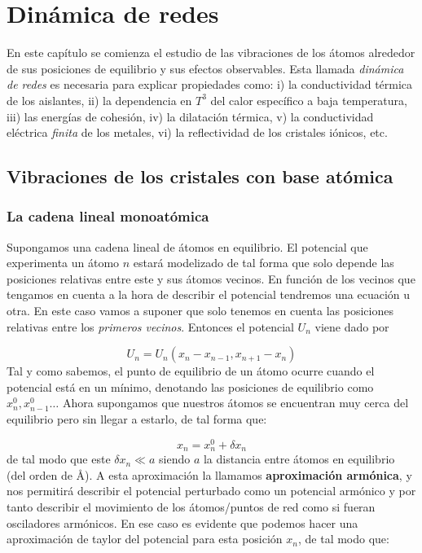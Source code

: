 
\chapter{Dinámica de redes} \label{Ch:04}

En este capítulo se comienza el estudio de las vibraciones de los átomos alrededor de sus posiciones de equilibrio y sus efectos observables. Esta llamada \textit{dinámica de redes} es necesaria para explicar propiedades como: i) la conductividad térmica de los aislantes, ii) la dependencia en $T^3$ del calor específico a baja temperatura, iii) las energías de cohesión, iv) la dilatación térmica, v) la conductividad eléctrica \textit{finita} de los metales, vi) la reflectividad de los cristales iónicos, etc.

\section{Vibraciones de los cristales con base atómica}

\subsection{La cadena lineal monoatómica}

Supongamos una cadena lineal de átomos en equilibrio. El potencial que experimenta un átomo $n$ estará modelizado de tal forma que solo depende las posiciones relativas entre este y sus átomos vecinos. En función de los vecinos que tengamos en cuenta a la hora de describir el potencial tendremos una ecuación u otra. En este caso vamos a suponer que solo tenemos en cuenta las posiciones relativas entre los \textit{primeros vecinos}. Entonces el potencial $U_n$ viene dado por

\begin{equation}
	U_n = U_n (x_n-x_{n-1},x_{n+1}-x_n)
\end{equation}
Tal y como sabemos, el punto de equilibrio de un átomo ocurre cuando el potencial está en un mínimo, denotando las posiciones de equilibrio como $x_n^0,x_{n-1}^0\ldots$ Ahora supongamos que nuestros átomos se encuentran muy cerca del equilibrio pero sin llegar a estarlo, de tal forma que:

\begin{equation}
	x_n = x_n^0 + \delta x_n
\end{equation}
de tal modo que este $\delta x_n \ll a$ siendo $a$ la distancia entre átomos en equilibrio (del orden de $\unit{\angstrom}$). A esta aproximación la llamamos \textbf{aproximación armónica}, y nos permitirá describir el potencial perturbado como un potencial armónico y por tanto describir el movimiento de los átomos/puntos de red como si fueran osciladores armónicos. En ese caso es evidente que podemos hacer una aproximación de taylor del potencial para esta posición $x_n$, de tal modo que:

